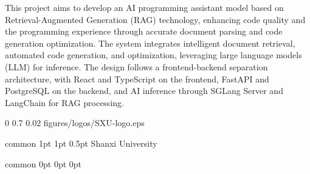 \documentclass[
    report,     %
    oneside,    %
    UTF8,       %
    zihao=-4    %
]{config} %
\begin{document}
\begin{abstractEN}[0.6cm] %

This project aims to develop an AI programming assistant model based on Retrieval-Augmented Generation (RAG) technology, enhancing code quality and the programming experience through accurate document parsing and code generation optimization. The system integrates intelligent document retrieval, automated code generation, and optimization, leveraging large language models (LLM) for inference. The design follows a frontend-backend separation architecture, with React and TypeScript on the frontend, FastAPI and PostgreSQL on the backend, and AI inference through SGLang Server and LangChain for RAG processing.

\def\keywordsEN{AI Programming Assistant; RAG; Code Generation; Document Parsing; LangChain; SGLang}

\end{abstractEN}




\imageWatermark %
    {0} %
    {0.7} %
    {0.02} %
    {figures/logos/SXU-logo.eps} %


\Header
    {common} %
    {1pt} %
    {1pt} %
    {0.5pt} %
    {Shanxi University} %
    {} %
    {\currentChapterInfo} %


\Footer
    {common} %
    {0pt} %
    {0pt} %
    {0pt} %
    {} %
    {\thepage} %
    {} %
\end{document}

